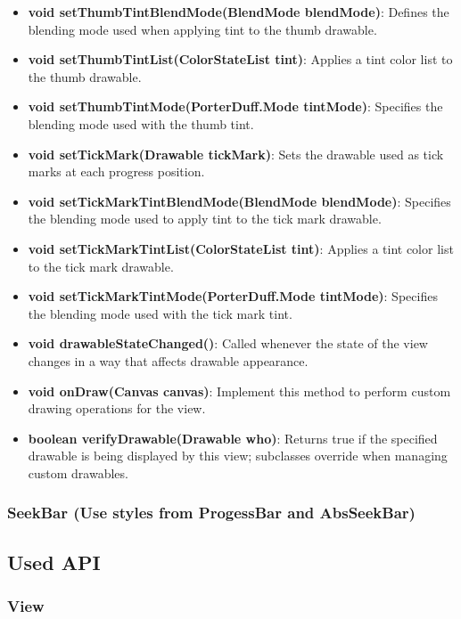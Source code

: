 \documentclass{report}
\begin{document}
\begin{itemize}
\begin{itemize}
        \item \textbf{void setThumbTintBlendMode(BlendMode blendMode)}: Defines the blending mode used when applying tint to the thumb drawable.
        \item \textbf{void setThumbTintList(ColorStateList tint)}: Applies a tint color list to the thumb drawable.
        \item \textbf{void setThumbTintMode(PorterDuff.Mode tintMode)}: Specifies the blending mode used with the thumb tint.
        \item \textbf{void setTickMark(Drawable tickMark)}: Sets the drawable used as tick marks at each progress position.
        \item \textbf{void setTickMarkTintBlendMode(BlendMode blendMode)}: Specifies the blending mode used to apply tint to the tick mark drawable.
        \item \textbf{void setTickMarkTintList(ColorStateList tint)}: Applies a tint color list to the tick mark drawable.
        \item \textbf{void setTickMarkTintMode(PorterDuff.Mode tintMode)}: Specifies the blending mode used with the tick mark tint.
        \item \textbf{void drawableStateChanged()}: Called whenever the state of the view changes in a way that affects drawable appearance.
        \item \textbf{void onDraw(Canvas canvas)}: Implement this method to perform custom drawing operations for the view.
        \item \textbf{boolean verifyDrawable(Drawable who)}: Returns true if the specified drawable is being displayed by this view; subclasses override when managing custom drawables.
    \end{itemize}



    \pagebreak 
    \subsubsection{SeekBar (Use styles from ProgessBar and AbsSeekBar)}


    \pagebreak 
    \subsection{Used API}
    \subsubsection{View}


\end{itemize}
\end{document}

